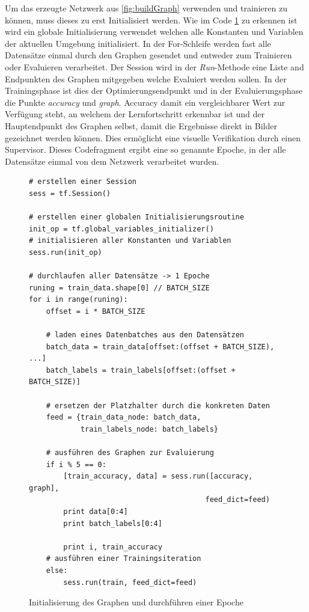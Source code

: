 Um das erzeugte Netzwerk aus \ref{fig:buildGraph} verwenden und trainieren zu können, muss dieses zu erst Initialisiert werden. 
Wie im Code \ref{fig:initRun} zu erkennen ist wird ein globale Initialisierung verwendet welchen alle Konstanten und Variablen der aktuellen Umgebung initialisiert. 
In der For-Schleife werden fast alle Datensätze einmal durch den Graphen gesendet und entweder zum Trainieren oder Evaluieren verarbeitet. 
Der Session wird in der \textit{Run}-Methode eine Liste and Endpunkten des Graphen mitgegeben welche Evaluiert werden sollen. 
In der Trainingsphase ist dies der Optimierungsendpunkt und in der Evaluierungsphase die Punkte \textit{accuracy} und \textit{graph}. 
Accuracy damit ein vergleichbarer Wert zur Verfügung steht, an welchem der Lernfortschritt erkennbar ist und der Hauptendpunkt des Graphen selbst, damit die Ergebnisse direkt in Bilder gezeichnet werden können. 
Dies ermöglicht eine visuelle Verifikation durch einen Supervisor. 
Dieses Codefragment ergibt eine so genannte Epoche, in der alle Datensätze einmal von dem Netzwerk verarbeitet wurden. 
\begin{figure}[ht!]
\lstset{language=Python}
\begin{lstlisting}
# erstellen einer Session
sess = tf.Session()

# erstellen einer globalen Initialisierungsroutine
init_op = tf.global_variables_initializer()
# initialisieren aller Konstanten und Variablen
sess.run(init_op)

# durchlaufen aller Datensätze -> 1 Epoche
runing = train_data.shape[0] // BATCH_SIZE
for i in range(runing):
    offset = i * BATCH_SIZE
    
    # laden eines Datenbatches aus den Datensätzen
    batch_data = train_data[offset:(offset + BATCH_SIZE), ...]
    batch_labels = train_labels[offset:(offset + BATCH_SIZE)]
    
    # ersetzen der Platzhalter durch die konkreten Daten
    feed = {train_data_node: batch_data, 
            train_labels_node: batch_labels}
     
    # ausführen des Graphen zur Evaluierung
    if i % 5 == 0:
        [train_accuracy, data] = sess.run([accuracy, graph], 
        								 feed_dict=feed)
        print data[0:4]
        print batch_labels[0:4]
        
        print i, train_accuracy
    # ausführen einer Trainingsiteration
    else:
        sess.run(train, feed_dict=feed)
\end{lstlisting}
	\caption{Initialisierung des Graphen und durchführen einer Epoche}
	\label{fig:initRun}
\end{figure}

